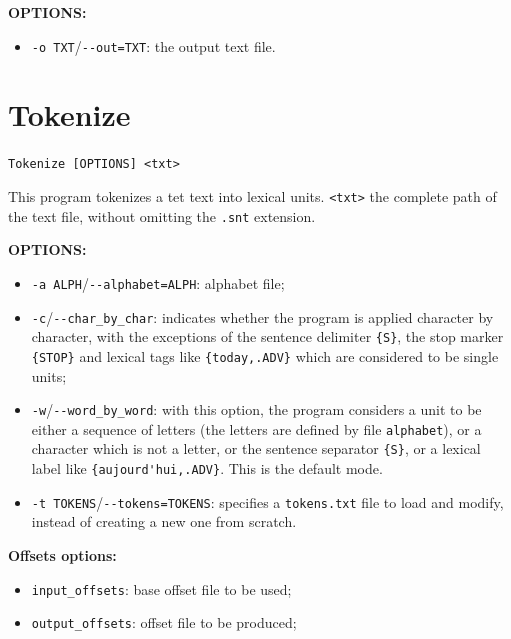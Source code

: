 \bigskip
\noindent \textbf{OPTIONS:}
\begin{itemize}
  \item \verb+-o TXT+/\verb+--out=TXT+: the output text file.
\end{itemize}







\section{Tokenize}
\verb+Tokenize [OPTIONS] <txt>+

\bigskip
\noindent This program tokenizes a tet text into lexical units.
\verb+<txt>+ the complete path of the text file, without omitting the \verb+.snt+ 
extension.

\bigskip
\noindent \textbf{OPTIONS:}
\begin{itemize}
  \item \verb+-a ALPH+/\verb+--alphabet=ALPH+: alphabet file;
  
  \item \verb+-c+/\verb+--char_by_char+: indicates whether the program is applied character by
  character, with the exceptions of the sentence delimiter \verb+{S}+,
  the stop marker \verb+{STOP}+ and lexical tags like \verb+{today,.ADV}+ which
  are considered to be single units;

 \item \verb+-w+/\verb+--word_by_word+: with this option, the program
  considers a unit to be either a sequence of letters (the letters are defined
  by file \verb+alphabet+), or a character which is not a letter, or the
  sentence separator \verb+{S}+, or a lexical label 
  like \verb+{aujourd'hui,.ADV}+. 
   This is the default mode.

 \item \verb+-t TOKENS+/\verb+--tokens=TOKENS+: specifies a \verb+tokens.txt+
 file to load and modify, instead of creating a new one from scratch.
\end{itemize}
\bigskip
\noindent \textbf{Offsets options:}
\begin{itemize}
  \item \verb+input_offsets+: base offset file to be used;
  \item \verb+output_offsets+: offset file to be produced;
\end{itemize}


